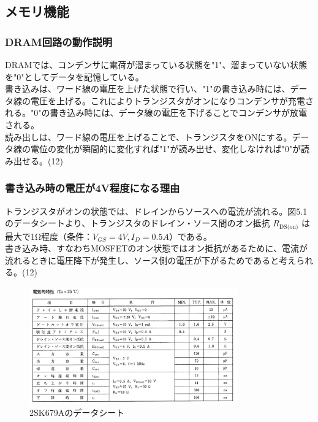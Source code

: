 \documentclass{jlreq}
\numberwithin{equation}{section}
\begin{document}
\subsection{メモリ機能}

\subsubsection{DRAM回路の動作説明}

DRAMでは、コンデンサに電荷が溜まっている状態を"1"、溜まっていない状態を"0"としてデータを記憶している。\\
書き込みは、ワード線の電圧を上げた状態で行い、"1"の書き込み時には、データ線の電圧を上げる。これによりトランジスタがオンになりコンデンサが充電される。"0"の書き込み時には、データ線の電圧を下げることでコンデンサが放電される。\\
読み出しは、ワード線の電圧を上げることで、トランジスタをONにする。データ線の電位の変化が瞬間的に変化すれば"1"が読み出せ、変化しなければ"0"が読み出せる。(12) \\

\subsubsection{書き込み時の電圧が4V程度になる理由}
トランジスタがオンの状態では、ドレインからソースへの電流が流れる。図5.1のデータシートより、トランジスタのドレイン・ソース間のオン抵抗 $R_{\text{DS(on)}}$ は最大で1Ω程度（条件：$V_{GS}=4V, I_D=0.5A$）である。\\
書き込み時、すなわちMOSFETのオン状態ではオン抵抗があるために、電流が流れるときに電圧降下が発生し、ソース側の電圧が下がるためであると考えられる。(12)

\begin{figure}[H]
  \centering
  \includegraphics[width=0.8\textwidth]{assets/datasheet.png}
  \caption{2SK679Aのデータシート}
\end{figure}
\end{document}
